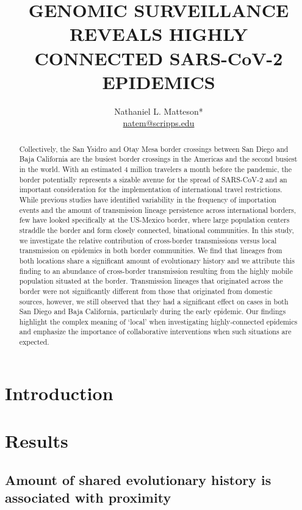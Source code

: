\documentclass[12pt, a4paper]{article}
\title{GENOMIC SURVEILLANCE REVEALS HIGHLY CONNECTED SARS-CoV-2 EPIDEMICS}
\author[1]{Nathaniel L. Matteson* \\ \href{mailto:natem@scripps.edu}{natem@scripps.edu}}
\affil[1]{Department of Immunology and Microbiology, Scripps Research }
\date{}
\begin{document}
    \maketitle

    \begin{abstract}
        Collectively, the San Ysidro and Otay Mesa border crossings between San Diego and Baja California are the busiest border crossings in the Americas and the second busiest in the world.
        With an estimated 4 million travelers a month before the pandemic, the border potentially represents a sizable avenue for the spread of SARS-CoV-2 and an important consideration for the implementation of international travel restrictions.
        While previous studies have identified variability in the frequency of importation events and the amount of transmission lineage persistence across international borders, few have looked specifically at the US-Mexico border, where large population centers straddle the border and form closely connected, binational communities.
        In this study, we investigate the relative contribution of cross-border transmissions versus local transmission on epidemics in both border communities.
        We find that lineages from both locations share a significant amount of evolutionary history and we attribute this finding to an abundance of cross-border transmission resulting from the highly mobile population situated at the border.
        Transmission lineages that originated across the border were not significantly different from those that originated from domestic sources, however, we still observed that they had a significant effect on cases in both San Diego and Baja California, particularly during the early epidemic.
        Our findings highlight the complex meaning of ‘local’ when investigating highly-connected epidemics and emphasize the importance of collaborative interventions when such situations are expected.
    \end{abstract}

    \newpage

    \raggedright
    \section*{Introduction}

    \section*{Results}
    \subsection*{Amount of shared evolutionary history is associated with proximity}
\end{document}
